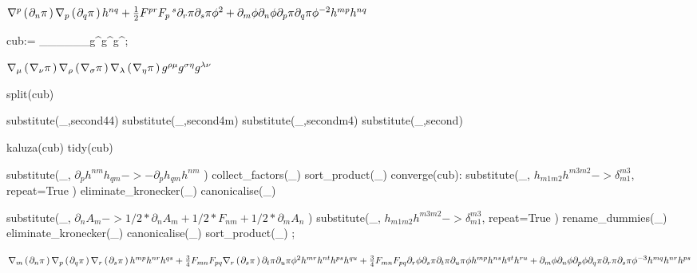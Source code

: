 \documentclass[10pt]{article}
\newcommand\brwrap[3]{%
  \setbox0=\hbox{$#2$}
  \left#1\vbox to \the\ht0{\hbox to 0pt{}}\right.\kern-.2em
  \begingroup #2\endgroup\kern-.15em
  \left.\vbox to \the\ht0{\hbox to 0pt{}}\right#3
}
\begin{document}
\begin{adjustwidth}{1em}{0cm}${}\nabla^{p}\brwrap{(}{\partial_{n}{\pi}}{)} \nabla_{p}\brwrap{(}{\partial_{q}{\pi}}{)} h^{n q}+\frac{1}{2}F^{p r} F_{p}\,^{s} \partial_{r}{\pi} \partial_{s}{\pi} {\phi}^{2}+\partial_{m}{\phi} \partial_{n}{\phi} \partial_{p}{\pi} \partial_{q}{\pi} {\phi}^{-2} h^{m p} h^{n q}$\end{adjustwidth}
\begin{python}
cub:= \nabla_{\mu}{\nabla_{\nu}{\pi}}\nabla_{\rho}{\nabla_{\sigma}{\pi}}\nabla_{\lambda}{\nabla_{\eta}{\pi}}g^{\rho \mu}g^{\sigma \eta}g^{\lambda \nu};
\end{python}
\begin{adjustwidth}{1em}{0cm}${}\nabla_{\mu}\brwrap{(}{\nabla_{\nu}{\pi}}{)} \nabla_{\rho}\brwrap{(}{\nabla_{\sigma}{\pi}}{)} \nabla_{\lambda}\brwrap{(}{\nabla_{\eta}{\pi}}{)} g^{\rho \mu} g^{\sigma \eta} g^{\lambda \nu}$\end{adjustwidth}
\begin{python}
split(cub)
\end{python}
\begin{python}
substitute(_,second44)
substitute(_,second4m)
substitute(_,secondm4)
substitute(_,second)
\end{python}
\begin{python}
kaluza(cub)
tidy(cub)
\end{python}
\begin{python}
substitute(_, $\partial_{p}{h^{n m}} h_{q m} -> - \partial_{p}{h_{q m}} h^{n m}$ )
collect_factors(_)
sort_product(_)
converge(cub):
	substitute(_, $h_{m1 m2} h^{m3 m2} -> \delta_{m1}^{m3}$, repeat=True )
	eliminate_kronecker(_)
	canonicalise(_)
\end{python}
\begin{python}
substitute(_, $\partial_{n}{A_{m}} -> 1/2*\partial_{n}{A_{m}} + 1/2*F_{n m} + 1/2*\partial_{m}{A_{n}}$ )
substitute(_, $h_{m1 m2} h^{m3 m2} -> \delta_{m1}^{m3}$, repeat=True )
rename_dummies(_)
eliminate_kronecker(_)
canonicalise(_)
sort_product(_)
;
\end{python}
\begin{adjustwidth}{1em}{0cm}${}\nabla_{m}\brwrap{(}{\partial_{n}{\pi}}{)} \nabla_{p}\brwrap{(}{\partial_{q}{\pi}}{)} \nabla_{r}\brwrap{(}{\partial_{s}{\pi}}{)} h^{m p} h^{n r} h^{q s}+\frac{3}{4}F_{m n} F_{p q} \nabla_{r}\brwrap{(}{\partial_{s}{\pi}}{)} \partial_{t}{\pi} \partial_{u}{\pi} {\phi}^{2} h^{m r} h^{n t} h^{p s} h^{q u}+\frac{3}{4}F_{m n} F_{p q} \partial_{r}{\phi} \partial_{s}{\pi} \partial_{t}{\pi} \partial_{u}{\pi} \phi h^{m p} h^{n s} h^{q t} h^{r u}+\partial_{m}{\phi} \partial_{n}{\phi} \partial_{p}{\phi} \partial_{q}{\pi} \partial_{r}{\pi} \partial_{s}{\pi} {\phi}^{-3} h^{m q} h^{n r} h^{p s}$\end{adjustwidth}
\end{document}
